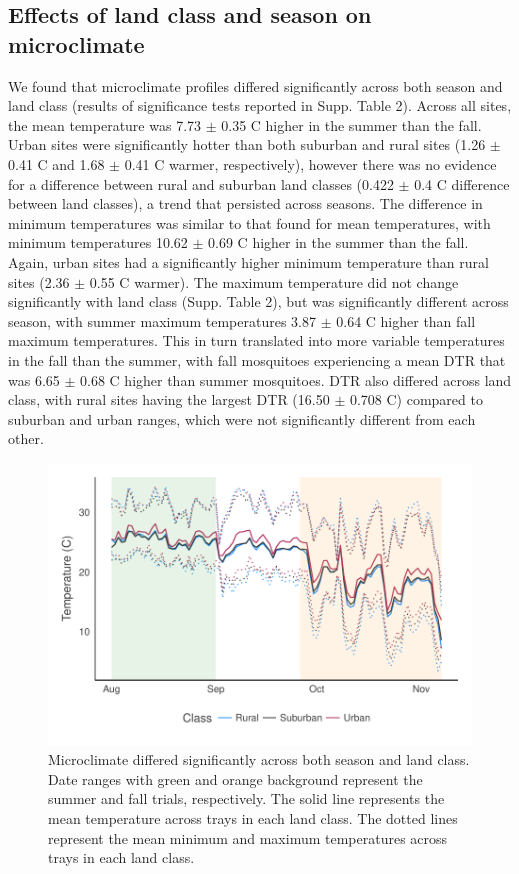 \documentclass[12pt]{article}
\begin{document}
\subsection{Effects of land class and season on microclimate}

We found that microclimate profiles differed significantly across both season and land class (results of significance tests reported in Supp. Table 2). Across all sites, the mean temperature was 7.73 $\pm$ 0.35 \degree C higher in the summer than the fall. Urban sites were significantly hotter than both suburban and rural sites (1.26 $\pm$ 0.41 \degree C and 1.68 $\pm$ 0.41 \degree C warmer, respectively), however there was no evidence for a difference between rural and suburban land classes (0.422 $\pm$ 0.4 \degree C difference between land classes), a trend that persisted across seasons. The difference in minimum temperatures was similar to that found for mean temperatures, with minimum temperatures 10.62 $\pm$ 0.69 \degree C higher in the summer than the fall. Again, urban sites had a significantly higher minimum temperature than rural sites (2.36 $\pm$ 0.55 \degree C warmer). The maximum temperature did not change significantly with land class (Supp. Table 2), but was significantly different across season, with summer maximum temperatures 3.87 $\pm$ 0.64 \degree C higher than fall maximum temperatures. This in turn translated into more variable temperatures in the fall than the summer, with fall mosquitoes experiencing a mean DTR that was 6.65 $\pm$ 0.68 \degree C higher than summer mosquitoes. DTR also differed across land class, with rural sites having the largest DTR (16.50 $\pm$ 0.708 \degree C) compared to suburban and urban ranges, which were not significantly different from each other.


\begin{figure}
\centering\includegraphics[width=0.9\linewidth]{temperature.pdf}
\caption{Microclimate differed significantly across both season and land class. Date ranges with green and orange background represent the summer and fall trials, respectively. The solid line represents the mean temperature across trays in each land class. The dotted lines represent the mean minimum and maximum temperatures across trays in each land class.}
\label{fig:temperature}
\end{figure}
\end{document}
